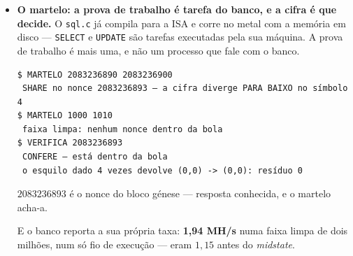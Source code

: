 \documentclass[11pt]{article}
\newcommand{\code}[1]{\texttt{\small #1}}
\theoremstyle{plain}
\theoremstyle{remark}
\begin{document}
\begin{itemize}
\textbf{E o venom entrou no catálogo, com régua inteira dos dois lados.} Uma versão anterior dizia que a
matriz inteira não existia; \textbf{existe}, e o $2^n$ é tão inteiro como o gato. As duas leis são
\emph{dois gatos}: o lado próprio é a lei \emph{aditiva} --- soma $1$ por passo, $A_1 = (1,-1)$,
\textbf{o rei}; o lado dual é a lei \emph{multiplicativa} --- vezes $2^N$ por nível,
$A_{16} = (16,-1)$. \textbf{E a cifra é infinita}, como a de todos: $[1;1,1,1,\dots]$ de um lado e
$[16;16,16,\dots]$ do outro. O que fica guardado é o \emph{período}, exatamente como nos outros.

A dualidade do venom \textbf{não é a de Wick} --- os dois lados não são $(B,C)$ e $(B,-C)$, são
dois gatos diferentes, e o que os emparelha é a curva. Fica dito.

\begin{verbatim}
 venom A1 e A16 [1;2;1;1;2;16;16]

 30 corpos, 18 lugares distintos. 18 réguas distintas, matriz métrica.
 mais PERTO: aureo e venom, prefixo 4 — distância 1/16
\end{verbatim}

\textbf{E o vizinho mais próximo diz o que ele é: o áureo.} Não por acaso --- o lado próprio do
venom \emph{é} o rei. \emph{``A curva é corpo áureo''}, e a régua confirmou-o sem lhe terem dito
nada. E está à distância máxima do \code{hipercorpo}, que é a sua outra metade: um tem Wick $1$, o
outro $2$ --- \emph{a régua separou-os pelo lado que fecha}.

\item \textbf{O martelo: a prova de trabalho é tarefa do banco, e a cifra é que decide.} O
\code{sql.c} já compila para a ISA e corre no metal com a memória em disco --- \code{SELECT} e
\code{UPDATE} são tarefas executadas pela sua máquina. A prova de trabalho é mais uma, e não um
processo que fale com o banco.

\begin{verbatim}
$ MARTELO 2083236890 2083236900
 SHARE no nonce 2083236893 — a cifra diverge PARA BAIXO no símbolo 4
$ MARTELO 1000 1010
 faixa limpa: nenhum nonce dentro da bola
$ VERIFICA 2083236893
 CONFERE — está dentro da bola
 o esquilo dado 4 vezes devolve (0,0) -> (0,0): resíduo 0
\end{verbatim}

$2083236893$ é o nonce do bloco génese --- resposta conhecida, e o martelo acha-a.

E o banco reporta a sua própria taxa: \textbf{1,94 MH/s} numa faixa limpa de dois milhões, num só
fio de execução --- eram $1{,}15$ antes do \emph{midstate}.


\end{itemize}
\end{document}
